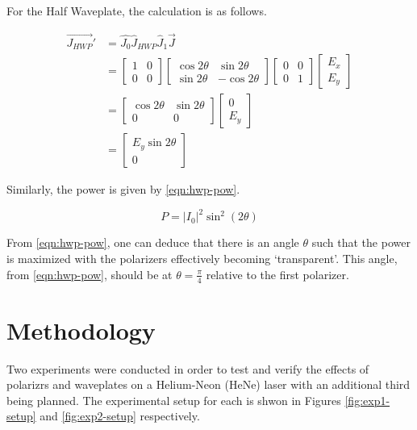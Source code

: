 \documentclass[aip, cp, amsmath, amssymb, reprint]{revtex4-2}
\begin{document}
        For the Half Waveplate, the calculation is as follows.

        \begin{align*}
            \vec{J_{HWP}}' &= \hat{J_0}\hat{J}_{HWP}\hat{J}_1\vec{J} \\
            &= \begin{bmatrix} 1 & 0 \\ 0 & 0\end{bmatrix}\begin{bmatrix} \cos2\theta & \sin2\theta \\ \sin2\theta & -\cos2\theta\end{bmatrix} \begin{bmatrix} 0 & 0 \\ 0 & 1\end{bmatrix}\begin{bmatrix} E_x \\ E_y\end{bmatrix} \\
            &= \begin{bmatrix} \cos2\theta & \sin2\theta \\ 0 & 0\end{bmatrix}\begin{bmatrix} 0 \\ E_y\end{bmatrix} \\
            &= \begin{bmatrix} E_y\sin2\theta \\ 0\end{bmatrix}
        \end{align*}

        Similarly, the power is given by \eqref{eqn:hwp-pow}.

        \begin{equation} \label{eqn:hwp-pow}
            P = |I_0|^2\sin^2(2\theta)
        \end{equation}

        From \eqref{eqn:hwp-pow}, one can deduce that there is an angle $\theta$ such that the power is maximized with the polarizers effectively becoming `transparent'. This angle, from \eqref{eqn:hwp-pow}, should be at $\theta = \frac{\pi}{4}$ relative to the first polarizer.        

    \section{Methodology}
        Two experiments were conducted in order to test and verify the effects of polarizrs and waveplates on a Helium-Neon (HeNe) laser with an additional third being planned. The experimental setup for each is shwon in Figures \ref{fig:exp1-setup} and \ref{fig:exp2-setup} respectively. 
        
\end{document}
